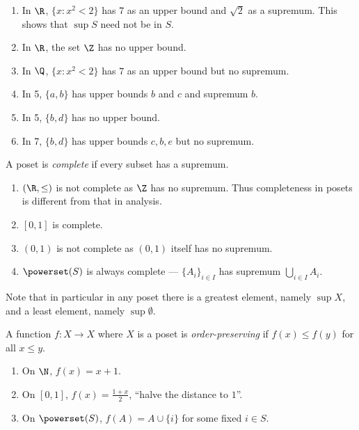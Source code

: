 \documentclass[a4paper]{article}
\begin{document}
\begin{eg}\leavevmode
  \begin{enumerate}
  \item In \(\R\), \(\{x: x^2 < 2\}\) has \(7\) as an upper bound and \(\sqrt 2\) as a supremum. This shows that \(\sup S\) need not be in \(S\).
  \item In \(\R\), the set \(\Z\) has no upper bound.
  \item In \(\Q\), \(\{x: x^2 < 2\}\) has \(7\) as an upper bound but no supremum.
  \item In 5, \(\{a, b\}\) has upper bounds \(b\) and \(c\) and supremum \(b\).
  \item In 5, \(\{b, d\}\) has no upper bound.
  \item In 7, \(\{b, d\}\) has upper bounds \(c, b, e\) but no supremum.
  \end{enumerate}
\end{eg}

\begin{definition}[Completeness]
  A poset is \emph{complete} if every subset has a supremum.
\end{definition}

\begin{eg}\leavevmode
  \begin{enumerate}
  \item \((\R, \leq)\) is not complete as \(\Z\) has no supremum. Thus completeness in posets is different from that in analysis.
  \item \([0, 1]\) is complete.
  \item \((0, 1)\) is not complete as \((0, 1)\) itself has no supremum.
  \item \(\powerset(S)\) is always complete --- \(\{A_i\}_{i \in I}\) has supremum \(\bigcup_{i \in I} A_i\).
  \end{enumerate}
\end{eg}

Note that in particular in any poset there is a greatest element, namely \(\sup X\), and a least element, namely \(\sup \emptyset\).

\begin{definition}
  A function \(f: X \to X\) where \(X\) is a poset is \emph{order-preserving} if \(f(x) \leq f(y)\) for all \(x \leq y\).
\end{definition}

\begin{eg}\leavevmode
  \begin{enumerate}
  \item On \(\N\), \(f(x) = x + 1\).
  \item On \([0, 1]\), \(f(x) = \frac{1 + x}{2}\), ``halve the distance to \(1\)''.
  \item On \(\powerset(S)\), \(f(A) = A \cup \{i\}\) for some fixed \(i \in S\).
  \end{enumerate}
\end{eg}
\end{document}
